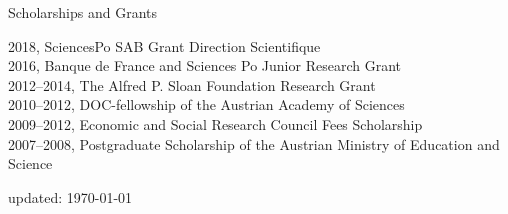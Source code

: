\documentclass{cvjobmarket} %
\begin{document}











\begin{rSection}{Scholarships and Grants}

{2018, SciencesPo SAB Grant Direction Scientifique}\\
{2016, Banque de France and Sciences Po Junior Research Grant}\\
{2012--2014, The Alfred P. Sloan Foundation Research Grant}\\
{2010--2012, DOC-fellowship of the Austrian Academy of Sciences}\\
{2009--2012, Economic and Social Research Council Fees Scholarship}\\
{2007--2008, Postgraduate Scholarship of the Austrian Ministry of Education and Science}

\end{rSection}


updated: \today
\end{document}
